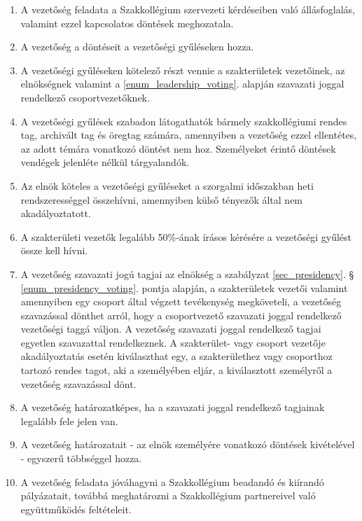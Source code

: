 \documentclass[12pt]{report}
\begin{document}
\begin{enumerate}
  \item A vezetőség feladata a Szakkollégium szervezeti kérdéseiben való állásfoglalás, valamint ezzel kapcsolatos döntések meghozatala.
  \item A vezetőség a döntéseit a vezetőségi gyűléseken hozza.
  \item A vezetőségi gyűléseken kötelező részt vennie a szakterületek vezetőinek, az elnökségnek valamint a \ref{enum_leadership_voting}. alapján szavazati joggal rendelkező csoportvezetőknek.
  \item A vezetőségi gyűlések szabadon látogathatók bármely szakkollégiumi rendes tag, archivált tag és öregtag számára, amennyiben a vezetőség ezzel ellentétes,
    az adott témára vonatkozó döntést nem hoz. Személyeket érintő döntések vendégek jelenléte nélkül tárgyalandók.
  \item Az elnök köteles a vezetőségi gyűléseket a szorgalmi időszakban heti rendszerességgel összehívni, amennyiben külső tényezők által nem akadályoztatott. \label{enum_leadership_meeting}
  \item A szakterületi vezetők legalább 50\%-ának írásos kérésére a vezetőségi gyűlést össze kell hívni.
  \item A vezetőség szavazati jogú tagjai az elnökség a szabályzat \ref{sec_presidency}. § \ref{enum_presidency_voting}. pontja alapján, a szakterületek vezetői valamint amennyiben egy csoport 
    által végzett tevékenység megköveteli, a vezetőség szavazással dönthet arról, hogy a csoportvezető szavazati joggal rendelkező vezetőségi taggá váljon. A vezetőség szavazati joggal 
    rendelkező tagjai egyetlen szavazattal rendelkeznek. A szakterület- vagy csoport vezetője akadályoztatás esetén kiválaszthat egy, a szakterülethez vagy csoporthoz 
    tartozó rendes tagot, aki a személyében eljár, a kiválasztott személyről a vezetőség szavazással dönt. \label{enum_leadership_voting}
  \item A vezetőség határozatképes, ha a szavazati joggal rendelkező tagjainak legalább fele jelen van.
  \item A vezetőség határozatait - az elnök személyére vonatkozó döntések kivételével - egyszerű többséggel hozza.
  \item A vezetőség feladata jóváhagyni a Szakkollégium beadandó és kiírandó pályázatait, továbbá meghatározni a Szakkollégium partnereivel való együttműködés feltételeit.
\end{enumerate}

\end{document}
